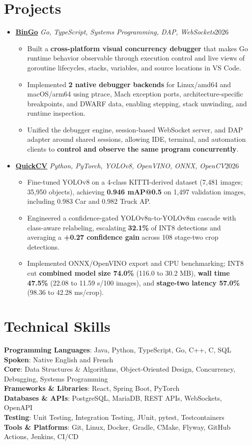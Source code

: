\documentclass[letterpaper,11pt]{article}
\newcommand{\resumeItem}[1]{
  \item\small{
    {#1 \vspace{-2pt}}
  }
}
\newcommand{\resumeProjectHeading}[2]{
  \vspace{-2pt}\item
  \small #1\hfill #2\\[-4pt]
}
\newcommand{\resumeSubHeadingListStart}{\begin{itemize}[leftmargin=0.15in, label={}, itemsep=0pt]}
\newcommand{\resumeSubHeadingListEnd}{\end{itemize}}
\newcommand{\resumeItemListStart}{\begin{itemize}[leftmargin=0.22in, topsep=2pt, itemsep=0pt]}
\newcommand{\resumeItemListEnd}{\end{itemize}\vspace{-5pt}}
\begin{document}
\section{Projects}
\resumeSubHeadingListStart
\resumeProjectHeading
{\textbf{\href{https://github.com/bingosuite/bingo}{BinGo}} \textbar{} \emph{Go, TypeScript, Systems Programming, DAP, WebSockets}}{2026}
\resumeItemListStart
\resumeItem{Built a \textbf{cross-platform visual concurrency debugger} that makes Go runtime behavior observable through execution control and live views of goroutine lifecycles, stacks, variables, and source locations in VS Code.}
\resumeItem{Implemented \textbf{2 native debugger backends} for Linux/amd64 and macOS/arm64 using ptrace, Mach exception ports, architecture-specific breakpoints, and DWARF data, enabling stepping, stack unwinding, and runtime inspection.}
\resumeItem{Unified the debugger engine, session-based WebSocket server, and DAP adapter around shared sessions, allowing IDE, terminal, and automation clients to \textbf{control and observe the same program concurrently}.}
\resumeItemListEnd
\resumeProjectHeading
{\textbf{\href{https://github.com/Egzavyer/QuickCV}{QuickCV}} \textbar{} \emph{Python, PyTorch, YOLOv8, OpenVINO, ONNX, OpenCV}}{2026}
\resumeItemListStart
\resumeItem{Fine-tuned YOLOv8 on a 4-class KITTI-derived dataset (7,481 images; 35,950 objects), achieving \textbf{0.946 mAP@0.5} on 1,497 validation images, including 0.983 Car and 0.982 Truck AP.}
\resumeItem{Engineered a confidence-gated YOLOv8n-to-YOLOv8m cascade with class-aware relabeling, escalating \textbf{32.1\%} of INT8 detections and averaging a \textbf{+0.27 confidence gain} across 108 stage-two crop detections.}
\resumeItem{Implemented ONNX/OpenVINO export and CPU benchmarking; INT8 cut \textbf{combined model size 74.0\%} (116.0 to 30.2 MB), \textbf{wall time 47.5\%} (22.08 to 11.59 s/100 images), and \textbf{stage-two latency 57.0\%} (98.36 to 42.28 ms/crop).}
\resumeItemListEnd
\resumeSubHeadingListEnd

\section{Technical Skills}
\begin{itemize}[leftmargin=0.15in, label={}]
  \small{\item{
          \textbf{Programming Languages}: Java, Python, TypeScript, Go, C++, C, SQL \textbar{} \textbf{Spoken}: Native English and French \\
          \textbf{Core}: Data Structures \& Algorithms, Object-Oriented Design, Concurrency, Debugging, Systems Programming \\
          \textbf{Frameworks \& Libraries}: React, Spring Boot, PyTorch \\
          \textbf{Databases \& APIs}: PostgreSQL, MariaDB, REST APIs, WebSockets, OpenAPI \\
          \textbf{Testing}: Unit Testing, Integration Testing, JUnit, pytest, Testcontainers \\
          \textbf{Tools \& Platforms}: Git, Linux, Docker, Gradle, CMake, Flyway, GitHub Actions, Jenkins, CI/CD \\
        }}
\end{itemize}
\end{document}
